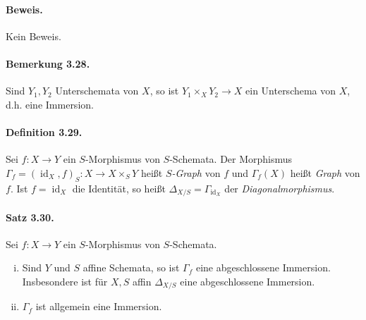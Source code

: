 \paragraph{Beweis.} Kein Beweis.

\paragraph{Bemerkung 3.28.}\label{3.28} Sind $Y_1,Y_2$ Unterschemata von $X$, so ist $Y_1\times_XY_2\to X$ ein Unterschema von $X$, d.h. eine Immersion.

\paragraph{Definition 3.29.}\label{3.29} Sei $f:X\to Y$ ein $S$-Morphismus von $S$-Schemata. Der Morphismus $\Gamma_f=(\operatorname{id}_X,f)_S:X\to X\times_SY$ heißt \textit{$S$-Graph} von $f$ und $\Gamma_f(X)$ heißt \textit{Graph} von $f$. Ist $f=\operatorname{id}_X$ die Identität, so heißt $\Delta_{X/S}=\Gamma_{\operatorname{id}_X}$ der \textit{Diagonalmorphismus}.

\paragraph{Satz 3.30.}\label{3.30} Sei $f:X\to Y$ ein $S$-Morphismus von $S$-Schemata. \begin{enumerate}[(i)]
\item Sind $Y$ und $S$ affine Schemata, so ist $\Gamma_f$ eine abgeschlossene Immersion. Insbesondere ist für $X,S$ affin $\Delta_{X/S}$ eine abgeschlossene Immersion.
\item $\Gamma_f$ ist allgemein eine Immersion.
\end{enumerate}

